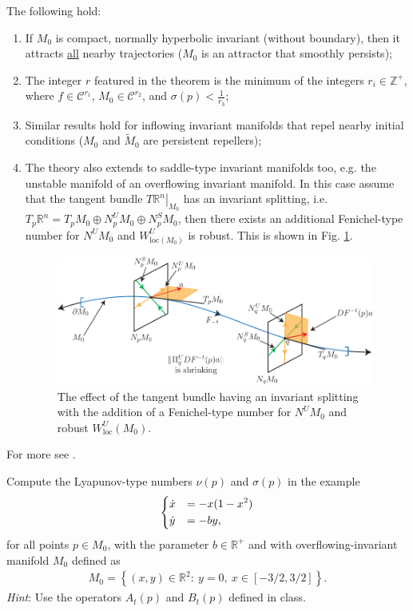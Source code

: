 \begin{remark}[]
	The following hold:
	\begin{enumerate}
		\item If $M_0$ is compact, normally hyperbolic invariant (without boundary), then it attracts \underline{all} nearby trajectories ($M_0$ is an attractor that smoothly persists);
		\item The integer $r$ featured in the theorem is the minimum of the integers $r_i\in \mathbb{Z}^{+}$, where $f \in \mathcal{C}^{r_1}$, $M_0 \in \mathcal{C}^{r_2}$, and $\sigma(p) < \frac{1}{r_3}$;
		\item Similar results hold for inflowing invariant manifolds that repel nearby initial conditions ($M_0$ and $\tilde{M}_{0}$ are persistent repellers);
		\item The theory also extends to saddle-type invariant manifolds too, e.g. the unstable manifold of an overflowing invariant manifold. In this case assume that the tangent bundle $\left.T\mathbb{R}^{n}\right|_{M_0}$ has an invariant splitting, i.e. $T_{p}\mathbb{R}^{n} = T_pM_0 \oplus N_{p}^{U}M_0 \oplus N_{p}^{S}M_0$, then there exists an additional Fenichel-type number for $N^{U}M_0$ and $W^{U}_{ \textrm{loc} (M_0)}$ is robust. This is shown in Fig. \ref{fig:fenichel_thm_rmks}.
		\begin{figure}[h!]
			\centering
			\includegraphics[width=0.99\textwidth]{figures/ch9/16fenichel_thm_rmks.pdf}
			\caption{The effect of the tangent bundle having an invariant splitting with the addition of a Fenichel-type number for $N^{U}M_0$ and robust $W^{U}_{ \textrm{loc} }(M_0)$.}
			\label{fig:fenichel_thm_rmks}
		\end{figure}
	\end{enumerate}
\end{remark}
For more see \cite{Wiggins1994}.

\begin{exercise}
Compute the Lyapunov-type numbers $\nu(p)$ and $\sigma(p)$ in the example
\begin{align}
\begin{dcases}
	\dot{x} &=-x(1-x^{2})\\
	\dot{y} &=-by,
\end{dcases}
\end{align}
for all points $p\in M_{0}$, with the parameter $b\in\mathbb{R}^{+}$ and with overflowing-invariant manifold $M_{0}$ defined as
\begin{align}
M_{0}=\left\{ (x,y)\in\mathbb{R}^{2}:\ y=0,\ x\in\left[-3/2,3/2\right]\right\} .
\end{align}
\emph{Hint}: Use the operators $A_{t}(p)$ and $B_{t}(p)$ defined in class. 
\end{exercise}

